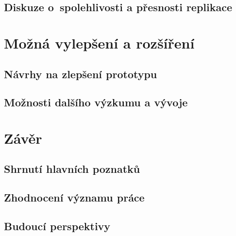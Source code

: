 \section{Diskuze o~spolehlivosti a přesnosti replikace}

\chapter{Možná vylepšení a rozšíření}
\section{Návrhy na zlepšení prototypu}
\section{Možnosti dalšího výzkumu a vývoje}

\chapter{Závěr}
\section{Shrnutí hlavních poznatků}
\section{Zhodnocení významu práce}
\section{Budoucí perspektivy}


%
